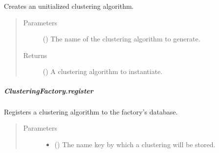 \documentclass[letterpaper,10pt,english]{sphinxmanual}
\begin{document}
\begin{fulllineitems}
\begin{fulllineitems}
\label{\detokenize{api/generated/directional_clustering.clustering.ClusteringFactory.create:directional_clustering.clustering.ClusteringFactory.create}}
Creates an unitialized clustering algorithm.
\begin{quote}\begin{description}
\item[{Parameters}] \leavevmode
{} () \textendash{} The name of the clustering algorithm to generate.

\item[{Returns}] \leavevmode
{} () \textendash{} A clustering algorithm to instantiate.

\end{description}\end{quote}

\end{fulllineitems}



\subparagraph{ClusteringFactory.register}
\label{\detokenize{api/generated/directional_clustering.clustering.ClusteringFactory.register:clusteringfactory-register}}\label{\detokenize{api/generated/directional_clustering.clustering.ClusteringFactory.register::doc}}

\begin{fulllineitems}
\label{\detokenize{api/generated/directional_clustering.clustering.ClusteringFactory.register:directional_clustering.clustering.ClusteringFactory.register}}
Registers a clustering algorithm to the factory’s database.
\begin{quote}\begin{description}
\item[{Parameters}] \leavevmode\begin{itemize}
\item {} 
 () \textendash{} The name key by which a clustering will be stored.


\end{itemize}
\end{description}
\end{quote}
\end{fulllineitems}
\end{fulllineitems}
\end{document}
